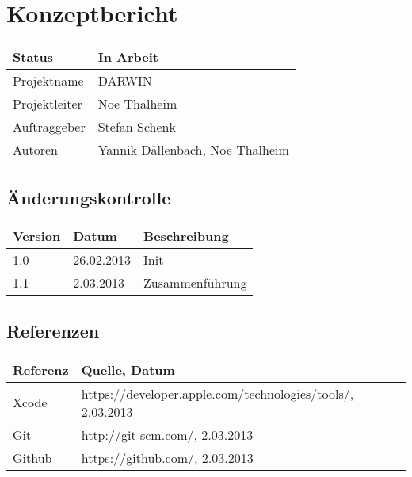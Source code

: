 \documentclass{scrartcl}
\begin{document}
	\section*{Konzeptbericht}
	
	\begin{tabularx}{\textwidth}{| X | X |}
	\hline
	Status & In Arbeit\\
	\hline
	Projektname & DARWIN\\
	\hline
	Projektleiter & Noe Thalheim\\
	\hline
	Auftraggeber & Stefan Schenk\\
	\hline
	Autoren & Yannik Dällenbach, Noe Thalheim\\
	\hline
	\end{tabularx}
	
	\subsection*{Änderungskontrolle}
	\begin{tabularx}{\textwidth}{| X | X | X |}
	\hline
	\rowcolor[gray]{0.9} Version & Datum & Beschreibung\\
	\hline
	1.0 & 26.02.2013 & Init\\
	\hline
	1.1 & 2.03.2013 & Zusammenführung\\
	\hline
	\end{tabularx}

	\subsection*{Referenzen}
	
	\begin{tabularx}{\textwidth}{| p{2.0cm} | X | }
	\hline
	\rowcolor[gray]{0.9} Referenz & Quelle, Datum\\
	\hline
	 Xcode & https://developer.apple.com/technologies/tools/, 2.03.2013\\
	 \hline
 	 Git & http://git-scm.com/, 2.03.2013\\
	 \hline
	 Github & https://github.com/, 2.03.2013\\
	 \hline
	\end{tabularx}
	
	\pagebreak
	\tableofcontents
	\pagebreak
	
	
	
	
	
	
	
	
\end{document}

